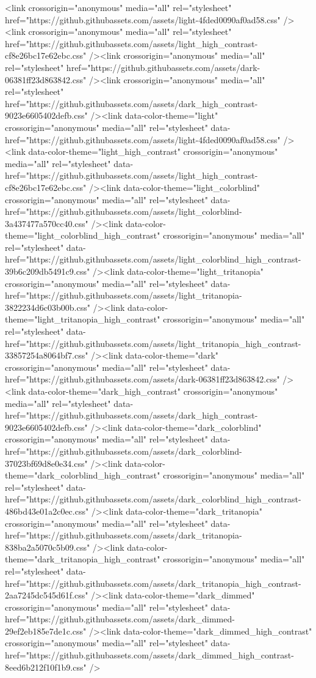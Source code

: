   <link crossorigin="anonymous" media="all" rel="stylesheet" href="https://github.githubassets.com/assets/light-4fded0090af0ad58.css" /><link crossorigin="anonymous" media="all" rel="stylesheet" href="https://github.githubassets.com/assets/light_high_contrast-cf8e26bc17e62ebc.css" /><link crossorigin="anonymous" media="all" rel="stylesheet" href="https://github.githubassets.com/assets/dark-06381ff23d863842.css" /><link crossorigin="anonymous" media="all" rel="stylesheet" href="https://github.githubassets.com/assets/dark_high_contrast-9023e6605402defb.css" /><link data-color-theme="light" crossorigin="anonymous" media="all" rel="stylesheet" data-href="https://github.githubassets.com/assets/light-4fded0090af0ad58.css" /><link data-color-theme="light_high_contrast" crossorigin="anonymous" media="all" rel="stylesheet" data-href="https://github.githubassets.com/assets/light_high_contrast-cf8e26bc17e62ebc.css" /><link data-color-theme="light_colorblind" crossorigin="anonymous" media="all" rel="stylesheet" data-href="https://github.githubassets.com/assets/light_colorblind-3a437477a570cc40.css" /><link data-color-theme="light_colorblind_high_contrast" crossorigin="anonymous" media="all" rel="stylesheet" data-href="https://github.githubassets.com/assets/light_colorblind_high_contrast-39b6c209db5491c9.css" /><link data-color-theme="light_tritanopia" crossorigin="anonymous" media="all" rel="stylesheet" data-href="https://github.githubassets.com/assets/light_tritanopia-3822234d6c03b00b.css" /><link data-color-theme="light_tritanopia_high_contrast" crossorigin="anonymous" media="all" rel="stylesheet" data-href="https://github.githubassets.com/assets/light_tritanopia_high_contrast-33857254a8064bf7.css" /><link data-color-theme="dark" crossorigin="anonymous" media="all" rel="stylesheet" data-href="https://github.githubassets.com/assets/dark-06381ff23d863842.css" /><link data-color-theme="dark_high_contrast" crossorigin="anonymous" media="all" rel="stylesheet" data-href="https://github.githubassets.com/assets/dark_high_contrast-9023e6605402defb.css" /><link data-color-theme="dark_colorblind" crossorigin="anonymous" media="all" rel="stylesheet" data-href="https://github.githubassets.com/assets/dark_colorblind-37023bf69d8e0e34.css" /><link data-color-theme="dark_colorblind_high_contrast" crossorigin="anonymous" media="all" rel="stylesheet" data-href="https://github.githubassets.com/assets/dark_colorblind_high_contrast-486bd43e01a2c0ec.css" /><link data-color-theme="dark_tritanopia" crossorigin="anonymous" media="all" rel="stylesheet" data-href="https://github.githubassets.com/assets/dark_tritanopia-838ba2a5070c5b09.css" /><link data-color-theme="dark_tritanopia_high_contrast" crossorigin="anonymous" media="all" rel="stylesheet" data-href="https://github.githubassets.com/assets/dark_tritanopia_high_contrast-2aa7245dc545d61f.css" /><link data-color-theme="dark_dimmed" crossorigin="anonymous" media="all" rel="stylesheet" data-href="https://github.githubassets.com/assets/dark_dimmed-29ef2eb185e7de1c.css" /><link data-color-theme="dark_dimmed_high_contrast" crossorigin="anonymous" media="all" rel="stylesheet" data-href="https://github.githubassets.com/assets/dark_dimmed_high_contrast-8eed6b212f10f1b9.css" />

